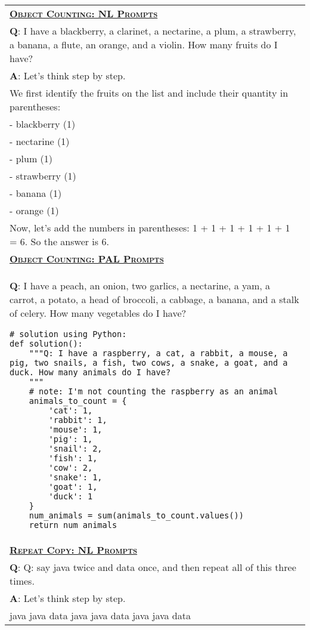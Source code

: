 \begin{table}[htbp]
    \centering
    \begin{tabular}{p{}}
        \toprule
        \underline{\textbf{\textsc{Object Counting: NL Prompts}}} \\
\textbf{Q}: I have a blackberry, a clarinet, a nectarine, a plum, a strawberry, a banana, a flute, an orange, and a violin. How many fruits do I have? \\
        \textbf{A}: Let's think step by step. \\
We first identify the fruits on the list and include their quantity in parentheses: \\
- blackberry (1) \\
- nectarine (1) \\
- plum (1) \\
- strawberry (1) \\
- banana (1) \\
- orange (1) \\
Now, let's add the numbers in parentheses: 1 + 1 + 1 + 1 + 1 + 1 = 6. So the answer is 6. \\
        \midrule
        \underline{\textbf{\textsc{Object Counting: PAL Prompts}}} \\
 \textbf{Q}: I have a peach, an onion, two garlics, a nectarine, a yam, a carrot, a potato, a head of broccoli, a cabbage, a banana, and a stalk of celery. How many vegetables do I have?
\begin{verbatim}
# solution using Python:
def solution():
    """Q: I have a raspberry, a cat, a rabbit, a mouse, a pig, two snails, a fish, two cows, a snake, a goat, and a duck. How many animals do I have?
    """
    # note: I'm not counting the raspberry as an animal
    animals_to_count = {
        'cat': 1,
        'rabbit': 1,
        'mouse': 1,
        'pig': 1,
        'snail': 2,
        'fish': 1,
        'cow': 2,
        'snake': 1,
        'goat': 1,
        'duck': 1
    }
    num_animals = sum(animals_to_count.values())
    return num_animals
\end{verbatim}
        \\
        \midrule
\underline{\textbf{\textsc{Repeat Copy: NL Prompts}}} \\
\textbf{Q}: Q: say java twice and data once, and then repeat all of this three times. \\
        \textbf{A}: Let's think step by step. \\
java java data java java data java java data \\


\end{tabular}
\end{table}
